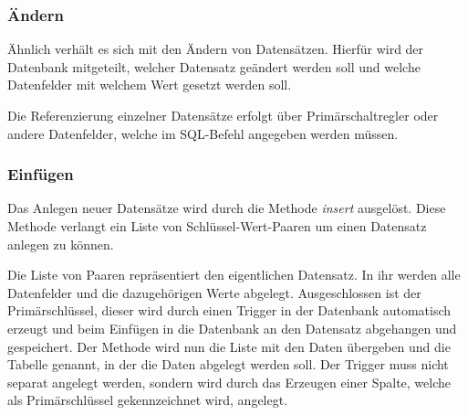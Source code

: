 \subsubsection{Ändern}

Ähnlich verhält es sich mit den Ändern von Datensätzen. Hierfür wird der Datenbank mitgeteilt, welcher Datensatz geändert werden soll und welche Datenfelder mit welchem Wert gesetzt werden soll.

Die Referenzierung einzelner Datensätze erfolgt über Primärschaltregler oder andere Datenfelder, welche im SQL-Befehl angegeben werden müssen.

\subsubsection{Einfügen}

Das Anlegen neuer Datensätze wird durch die Methode \textit{insert} ausgelöst. Diese Methode verlangt ein Liste von Schlüssel-Wert-Paaren um einen Datensatz anlegen zu können.

Die Liste von Paaren repräsentiert den eigentlichen Datensatz. In ihr werden alle Datenfelder und die dazugehörigen Werte abgelegt. Ausgeschlossen ist der Primärschlüssel, dieser wird durch einen Trigger in der Datenbank automatisch erzeugt und beim Einfügen in die Datenbank an den Datensatz abgehangen und gespeichert. Der Methode wird nun die Liste mit den Daten übergeben und die Tabelle genannt, in der die Daten abgelegt werden soll. Der Trigger muss nicht separat angelegt werden, sondern wird durch das Erzeugen einer Spalte, welche als Primärschlüssel gekennzeichnet wird, angelegt.